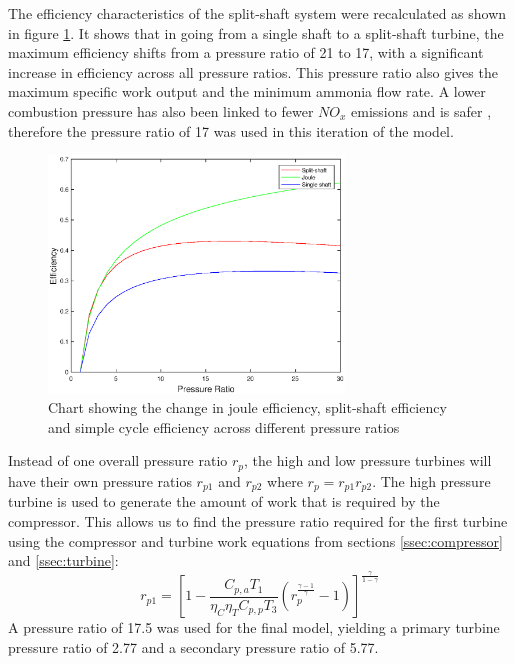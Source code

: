 The efficiency characteristics of the split-shaft system were recalculated as shown in figure \ref{fig:twinefficiency}. It shows that in going from a single shaft to a split-shaft turbine, the maximum efficiency shifts from a pressure ratio of 21 to 17, with a significant increase in efficiency across all pressure ratios. This pressure ratio also gives the maximum specific work output and the minimum ammonia flow rate. A lower combustion pressure has also been linked to fewer $NO_x$ emissions and is safer \cite{junLi}, therefore the pressure ratio of 17 was used in this iteration of the model. 
\begin{figure} [h]
\centering
\includegraphics[width=0.7\textwidth]{./pictures/efficiencyPT.eps}
  \caption{Chart showing the change in joule efficiency, split-shaft efficiency and simple cycle efficiency across different pressure ratios} \label{fig:twinefficiency}
  \end{figure}
  
Instead of one overall pressure ratio $r_p$, the high and low pressure turbines will have their own pressure ratios $r_{p1}$ and $r_{p2}$ where $r_p = r_{p1} r_{p2}$. The high pressure turbine is used to generate the amount of work that is required by the compressor. This allows us to find the pressure ratio required for the first turbine using the compressor and turbine work equations from sections \ref{ssec:compressor} and \ref{ssec:turbine}:
\begin{equation}
r_{p1} = [1-\frac{C_{p, a} T_1}{\eta_C \eta_T C_{p, p} T_3} (r_p^\frac{\gamma -1}{\gamma}-1)]^{\frac{\gamma}{1-\gamma}}
\end{equation} %
A pressure ratio of 17.5 was used for the final model, yielding a primary turbine pressure ratio of 2.77 and a secondary pressure ratio of 5.77.

